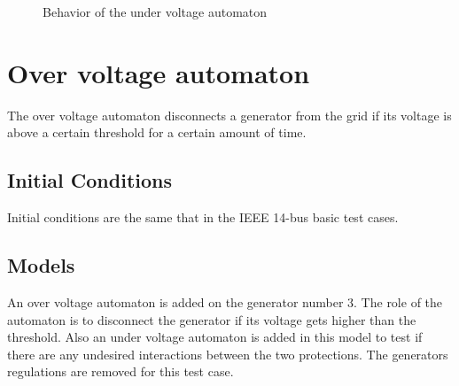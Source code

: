 \documentclass[a4paper, 12pt]{report}
\begin{document}
\begin{figure}[H]
\caption{Behavior of the under voltage automaton}
\end{figure}


\newpage
\section{Over voltage automaton}
\label{OverVoltageAutomaton}

The over voltage automaton disconnects a generator from the grid if its voltage is above a certain threshold for a certain amount of time.

\subsection{Initial Conditions}

Initial conditions are the same that in the IEEE 14-bus basic test cases.

\subsection{Models}

An over voltage automaton is added on the generator number 3. The role of the automaton is to disconnect the generator if its voltage gets higher than the threshold.
Also an under voltage automaton is added in this model to test if there are any undesired interactions between the two protections. The generators regulations are removed for this test case.\\
\end{document}
